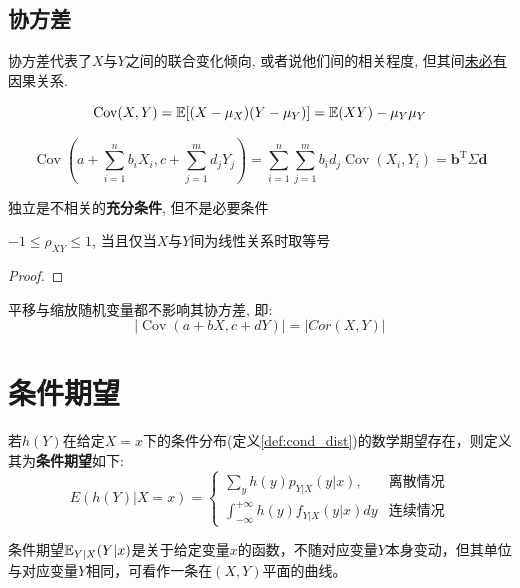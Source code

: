 \subsection{协方差}

协方差代表了$X$与$Y$之间的联合变化倾向, 或者说他们间的相关程度, 但其间\underline{未必有}因果关系.

\begin{theorem}
    \[ \operatorname{Cov} (X,Y)=\mathbb{E}[(X-\mu_X)(Y-\mu_Y)]=\mathbb{E}(XY)-\mu_Y \mu_Y \]
\end{theorem}

\begin{theorem}
    \[ \operatorname{Cov}(a+\sum_{i=1}^n b_i X_i,c+\sum_{j=1}^m d_j Y_j) = \sum_{i=1}^n\sum_{j=1}^m b_i d_j \operatorname{Cov}(X_i,Y_i) = \mathbf{b}^{\mathrm{T}}\Sigma \mathbf{d}\]
\end{theorem}

\begin{theorem}
    独立是不相关的\textbf{充分条件}, 但不是必要条件
\end{theorem}

\begin{theorem}
    $-1\le \rho_{XY} \le 1$, 当且仅当$X$与$Y$间为线性关系时取等号
\end{theorem}

\begin{proof}
\end{proof}

\begin{theorem}
    平移与缩放随机变量都不影响其协方差, 即:
    \[ \left| \operatorname{Cov}(a+ b X,c +d Y) \right| = \left| Cor(X,Y) \right|  \]
\end{theorem}

\section{条件期望}

\begin{definition}
    若$h(Y)$在给定$X=x$下的条件分布(定义\ref{def:cond_dist})的数学期望存在，则定义其为\textbf{条件期望}如下:
    \[ E(h(Y)|X=x) =\begin{cases}
            \sum_{y} h(y) p_{Y|X}(y|x),                    & \text{离散情况} \\
            \int_{-\infty}^{+\infty} h(y) f_{Y|X}(y|x) d y & \text{连续情况}
        \end{cases}\]
\end{definition}

\begin{remark}
    条件期望$\mathbb{E}_{Y|X}(Y|x)$是关于给定变量$x$的函数，不随对应变量$Y$本身变动，但其单位与对应变量$Y$相同，可看作一条在$(X,Y)$平面的曲线。
\end{remark}

